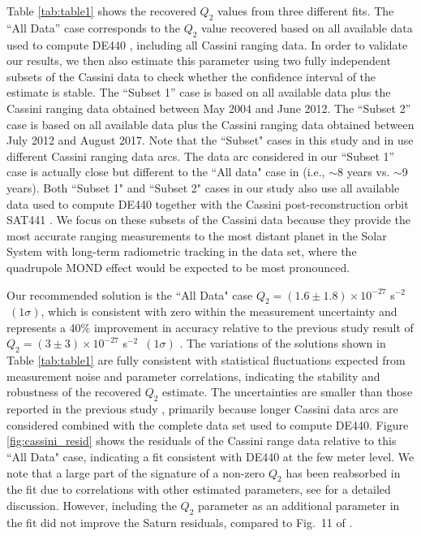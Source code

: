 \documentclass[reprint,nofootinbib,prd,aps]{revtex4-2}
\begin{document}
Table \ref{tab:table1} shows the recovered $Q_2$ values from three different fits. The “All Data” case corresponds to the $Q_2$ value recovered based on all available data used to compute DE440 \cite{ park_2021}, including all Cassini ranging data. In order to validate our results, we then also estimate this parameter using two fully independent subsets of the Cassini data to check whether the confidence interval of the estimate is stable. The “Subset 1” case is based on all available data plus the Cassini ranging data obtained between May 2004 and June 2012. The “Subset 2” case is based on all available data plus the Cassini ranging data obtained between July 2012 and August 2017. Note that the ``Subset" cases in this study and in \cite{hees_2014} use different Cassini ranging data arcs. The data arc considered in our “Subset 1” case is actually close but different to the ``All data" case in \cite{hees_2014} (i.e., $\sim$8 years vs. $\sim$9 years). Both ``Subset 1" and ``Subset 2" cases in our study also use all available data used to compute DE440 together with the Cassini post-reconstruction orbit SAT441 \cite{jacobson2022orbits}. We focus on these subsets of the Cassini data because they provide the most accurate ranging measurements to the most distant planet in the Solar System with long-term radiometric tracking in the data set, where the quadrupole MOND effect would be expected to be most pronounced. 

Our recommended solution is the ``All Data" case $Q_2=(1.6\pm1.8)\times 10^{-27}$ s$^{-2}$$~(1\sigma)$, which is consistent with zero within the measurement uncertainty and represents a 40\% improvement in accuracy relative to the previous study result of $Q_2=(3\pm3)\times 10^{-27}$ s$^{-2}$~$(1\sigma)$ \cite{hees_2014}. The variations of the solutions shown in Table \ref{tab:table1} are fully consistent with statistical fluctuations expected from measurement noise and parameter correlations, indicating the stability and robustness of the recovered $Q_2$ estimate. The uncertainties are smaller than those reported in the previous study \cite{hees_2014}, primarily because longer Cassini data arcs are considered combined with the complete data set used to compute DE440. Figure \ref{fig:cassini_resid} shows the residuals of the Cassini range data relative to this ``All Data" case, indicating a fit consistent with DE440 at the few meter level. We note that a large part of the signature of a non-zero $Q_2$ has been reabsorbed in the fit due to correlations with other estimated parameters, see \cite{Hees:2012} for a detailed discussion. However, including the $Q_2$ parameter as an additional parameter in the fit did not improve the Saturn residuals, compared to Fig.~11 of \cite{park_2021}. 
\end{document}

